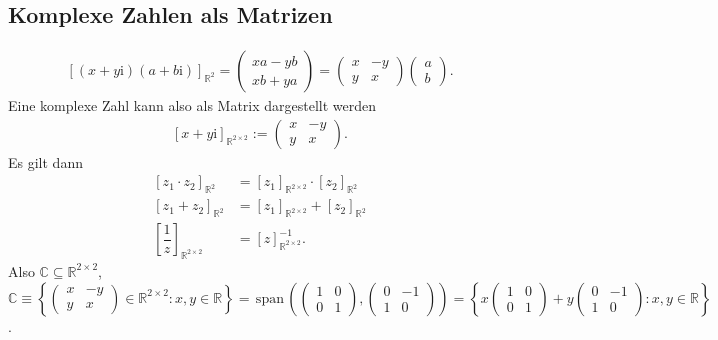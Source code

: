 \documentclass[a4paper,12pt]{article}
\numberwithin{equation}{section}
\begin{document}
\subsection{Komplexe Zahlen als Matrizen}
\begin{align} 
        \left[\left(x+y\text{i}\right)\left(a+b\text{i}\right)\right]_{\mathbb{R}^{2}}=\begin{pmatrix}
                xa-yb\\xb+ya
        \end{pmatrix}=\begin{pmatrix}
        x&-y\\y&x
        \end{pmatrix}\begin{pmatrix}
                a\\b
        \end{pmatrix}
.\end{align} 
Eine komplexe Zahl kann also als Matrix dargestellt werden
\begin{align} 
        \left[x+y\text{i}\right]_{\mathbb{R}^{2\times 2}}:=\begin{pmatrix}
                x&-y\\y&x
        \end{pmatrix}
.\end{align} 
Es gilt dann
\begin{align} 
        \left[z_1\cdot z_2\right]_{\mathbb{R}^2}&=\left[z_1\right]_{\mathbb{R}^{2\times 2}}\cdot \left[z_2\right]_{\mathbb{R}^{2}}\\
        \left[z_1+z_2\right]_{\mathbb{R}^2}&=\left[z_1\right]_{\mathbb{R}^{2\times 2}}+\left[z_2\right]_{\mathbb{R}^{2}}\\
        \left[\dfrac{1}{z}\right]_{\mathbb{R}^{2\times 2}}&=\left[z\right]_{\mathbb{R}^{2\times 2}}^{-1}
.\end{align} 
Also $\mathbb{C}\subseteq \mathbb{R}^{2\times 2}$, $\mathbb{C}\equiv \left\{\begin{pmatrix}
                x&-y\\y&x
\end{pmatrix} \in \mathbb{R}^{2\times 2}:x,y \in \mathbb{R}\right\}=\,\text{span}\,\left(\begin{pmatrix}
                1&0\\0&1
\end{pmatrix},\begin{pmatrix}
                0&-1\\1&0
\end{pmatrix}\right)=\left\{x \begin{pmatrix}
                1&0\\0&1
\end{pmatrix}+y \begin{pmatrix}
                0&-1\\1&0
\end{pmatrix}:x,y \in \mathbb{R}\right\}$.\\\indent
\end{document}
